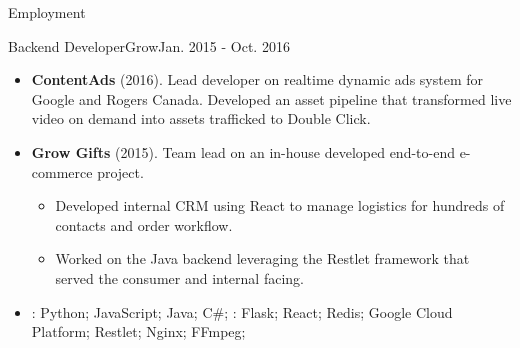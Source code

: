 \documentclass[]{mcdowellcv}
\begin{document}
\begin{cvsection}{Employment}
        \begin{cvsubsection}{Backend Developer}{Grow}{Jan. 2015 - Oct. 2016}
            \begin{itemize}
                \item \textbf{ContentAds} (2016). Lead developer on realtime dynamic ads system for Google and Rogers Canada. Developed an asset pipeline that transformed live video on demand into assets trafficked to Double Click.
            \end{itemize}
            \begin{itemize}
                \item \textbf{Grow Gifts} (2015). Team lead on an in-house developed end-to-end e-commerce project. 
                    \begin{itemize}
                         \item Developed internal CRM using React to manage logistics for hundreds of contacts and order workflow.
                         \item Worked on the Java backend leveraging the Restlet framework that served the consumer and internal facing.
                    \end{itemize}
            \end{itemize}
            \begin{itemize}
                 \item {}: Python; JavaScript; Java; C\#; \newline
                : Flask; React; Redis; Google Cloud Platform; Restlet; Nginx; FFmpeg;
            \end{itemize}
        \end{cvsubsection}
    \end{cvsection}
\end{document}

